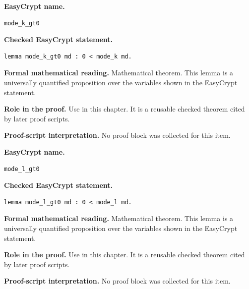 \begin{formaltheorem}
\noindent\textbf{EasyCrypt name.}
\begin{lstlisting}[language=EasyCrypt,basicstyle=\ttfamily\scriptsize]
mode_k_gt0
\end{lstlisting}
\noindent\textbf{Checked EasyCrypt statement.}
\begin{lstlisting}[language=EasyCrypt,basicstyle=\ttfamily\scriptsize]
lemma mode_k_gt0 md : 0 < mode_k md.
\end{lstlisting}
\noindent\textbf{Formal mathematical reading.}
Mathematical theorem. This lemma is a universally quantified proposition over the variables shown in the EasyCrypt statement.

\noindent\textbf{Role in the proof.}
Use in this chapter. It is a reusable checked theorem cited by later proof scripts.

\noindent\textbf{Proof-script interpretation.}
No proof block was collected for this item.

\end{formaltheorem}

\begin{formaltheorem}
\noindent\textbf{EasyCrypt name.}
\begin{lstlisting}[language=EasyCrypt,basicstyle=\ttfamily\scriptsize]
mode_l_gt0
\end{lstlisting}
\noindent\textbf{Checked EasyCrypt statement.}
\begin{lstlisting}[language=EasyCrypt,basicstyle=\ttfamily\scriptsize]
lemma mode_l_gt0 md : 0 < mode_l md.
\end{lstlisting}
\noindent\textbf{Formal mathematical reading.}
Mathematical theorem. This lemma is a universally quantified proposition over the variables shown in the EasyCrypt statement.

\noindent\textbf{Role in the proof.}
Use in this chapter. It is a reusable checked theorem cited by later proof scripts.

\noindent\textbf{Proof-script interpretation.}
No proof block was collected for this item.

\end{formaltheorem}

